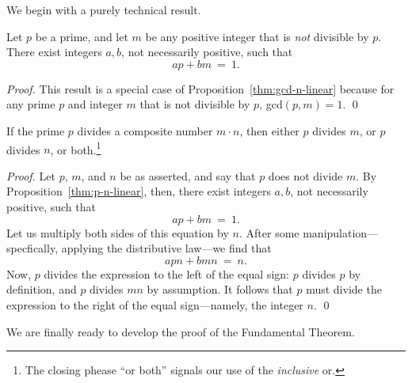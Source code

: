 We begin with a purely technical result.

\begin{prop}
\label{thm:p-n-linear}
Let $p$ be a prime, and let $m$ be any positive integer that is {\em
  not} divisible by $p$.  There exist integers $a, b$, not necessarily
positive, such that
\[ ap + bm \ = \ 1. \]
\end{prop}

\begin{proof}
This result is a special case of Proposition~\ref{thm:gcd-n-linear}
because for any prime $p$ and integer $m$ that is not divisible by
$p$, {\sc gcd}$(p, m) = 1$.
\qed
\end{proof}

\begin{prop}
\label{thm:p-divides-onefactor}
If the prime $p$ divides a composite number $m \cdot n$, then either
$p$ divides $m$, or $p$ divides $n$, or both.\footnote{The closing
  phease ``or both'' signals our use of the {\em inclusive} or.}
\end{prop}

\begin{proof}
Let $p$, $m$, and $n$ be as asserted, and say that $p$ does not divide
$m$.  By Proposition~\ref{thm:p-n-linear}, then, there exist integers
$a, b$, not necessarily positive, such that
\[ ap + bm \ = \ 1. \]
Let us multiply both sides of this equation by $n$.  After some
manipulation---specfically, applying the distributive law---we find
that
\[ apn + bmn \ = \ n. \]
Now, $p$ divides the expression to the left of the equal sign: $p$
divides $p$ by definition, and $p$ divides $mn$ by assumption.  It
follows that $p$ must divide the expression to the right of the equal
sign---namely, the integer $n$.  \qed
\end{proof}

We are finally ready to develop the proof of the Fundamental Theorem.

